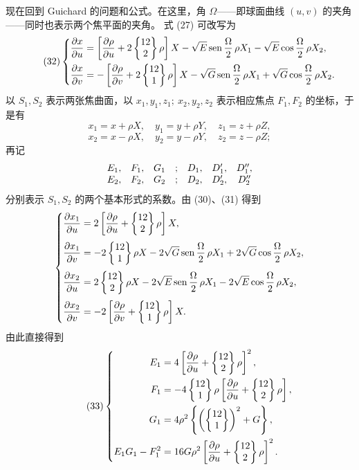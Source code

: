 现在回到 Guichard 的问题和公式。在这里，角 \(\Omega\)——即球面曲线 \((u,v)\) 的夹角——同时也表示两个焦平面的夹角。
式 (27) 可改写为
\begin{equation}\tag{32}
\left\{
\begin{aligned}
\frac{\partial x}{\partial u}&=\left[\frac{\partial\rho}{\partial u}+2\left\{\begin{matrix}12\\2\end{matrix}\right\}\rho\right]X
-\sqrt E\operatorname{sen}\frac\Omega2\,\rho X_1-\sqrt E\cos\frac\Omega2\,\rho X_2,\\
\frac{\partial x}{\partial v}&=-\left[\frac{\partial\rho}{\partial v}+2\left\{\begin{matrix}12\\1\end{matrix}\right\}\rho\right]X
-\sqrt G\operatorname{sen}\frac\Omega2\,\rho X_1+\sqrt G\cos\frac\Omega2\,\rho X_2.
\end{aligned}
\right.
\end{equation}
以 \(S_1,S_2\) 表示两张焦曲面，以 \(x_1,y_1,z_1;\ x_2,y_2,z_2\) 表示相应焦点 \(F_1,F_2\) 的坐标，于是有
\[
 x_1=x+\rho X,
\quad y_1=y+\rho Y,
\quad z_1=z+\rho Z,
\]
\[
 x_2=x-\rho X,
\quad y_2=y-\rho Y,
\quad z_2=z-\rho Z;
\]
再记
\[
\begin{array}{ccc@{\quad;\quad}ccc}
E_1,&F_1,&G_1& D_1,&D'_1,&D''_1,\\
E_2,&F_2,&G_2& D_2,&D'_2,&D''_2
\end{array}
\]
分别表示 \(S_1,S_2\) 的两个基本形式的系数。由 (30)、(31) 得到
\[
\left\{
\begin{aligned}
\frac{\partial x_1}{\partial u}&=2\left[\frac{\partial\rho}{\partial u}+\left\{\begin{matrix}12\\2\end{matrix}\right\}\rho\right]X,\\[0.25em]
\frac{\partial x_1}{\partial v}&=-2\left\{\begin{matrix}12\\1\end{matrix}\right\}\rho X-2\sqrt G\operatorname{sen}\frac\Omega2\,\rho X_1+2\sqrt G\cos\frac\Omega2\,\rho X_2,\\[0.25em]
\frac{\partial x_2}{\partial u}&=2\left\{\begin{matrix}12\\2\end{matrix}\right\}\rho X-2\sqrt E\operatorname{sen}\frac\Omega2\,\rho X_1-2\sqrt E\cos\frac\Omega2\,\rho X_2,\\[0.25em]
\frac{\partial x_2}{\partial v}&=-2\left[\frac{\partial\rho}{\partial v}+\left\{\begin{matrix}12\\1\end{matrix}\right\}\rho\right]X.
\end{aligned}
\right.
\]
由此直接得到
\begin{equation}\tag{33}
\left\{
\begin{aligned}
E_1&=4\left[\frac{\partial\rho}{\partial u}+\left\{\begin{matrix}12\\2\end{matrix}\right\}\rho\right]^2,\\
F_1&=-4\left\{\begin{matrix}12\\1\end{matrix}\right\}\rho\left[\frac{\partial\rho}{\partial u}+\left\{\begin{matrix}12\\2\end{matrix}\right\}\rho\right],\\
G_1&=4\rho^2\left\{\left(\left\{\begin{matrix}12\\1\end{matrix}\right\}\right)^2+G\right\},\\
E_1G_1-F_1^2&=16G\rho^2\left[\frac{\partial\rho}{\partial u}+\left\{\begin{matrix}12\\2\end{matrix}\right\}\rho\right]^2.
\end{aligned}
\right.
\end{equation}
